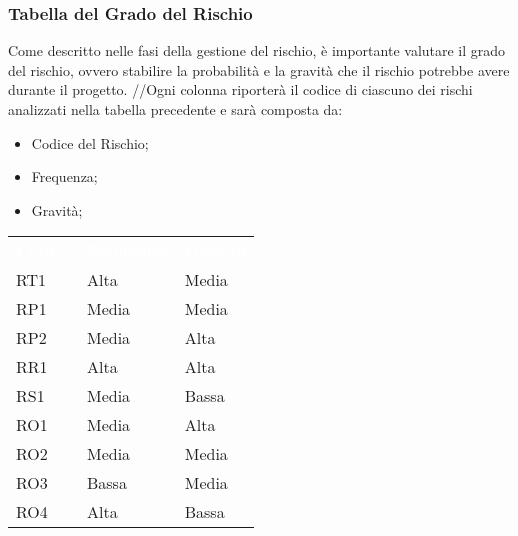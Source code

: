 \subsubsection{Tabella del Grado del Rischio}
Come descritto nelle fasi della gestione del rischio, è importante valutare il grado del rischio, ovvero stabilire la probabilità e la gravità che il rischio potrebbe avere durante il progetto.
//Ogni colonna riporterà il codice di ciascuno dei rischi analizzati nella tabella precedente e sarà composta da:
\begin{itemize}
	\item Codice del Rischio;
	\item Frequenza;
	\item Gravità;
\end{itemize}

{
	\renewcommand{\arraystretch}{2}
	\centering
	\begin{longtable}{ C{2cm} C{3cm} C{3cm}}
		\textcolor{white}{\textbf{Codice}} & \textcolor{white}{\textbf{Frequenza}} & \textcolor{white}{\textbf{Gravità}}\\	
		
		RT1 & Alta & Media\\
		
		RP1 & Media & Media\\
		
		RP2 & Media & Alta\\
		
		RR1 & Alta & Alta \\
		
		RS1 & Media & Bassa \\
		
		RO1 & Media & Alta \\
		
		RO2 & Media & Media \\
		
		RO3 & Bassa & Media \\
		
		RO4 & Alta & Bassa \\
		
	\end{longtable}
}